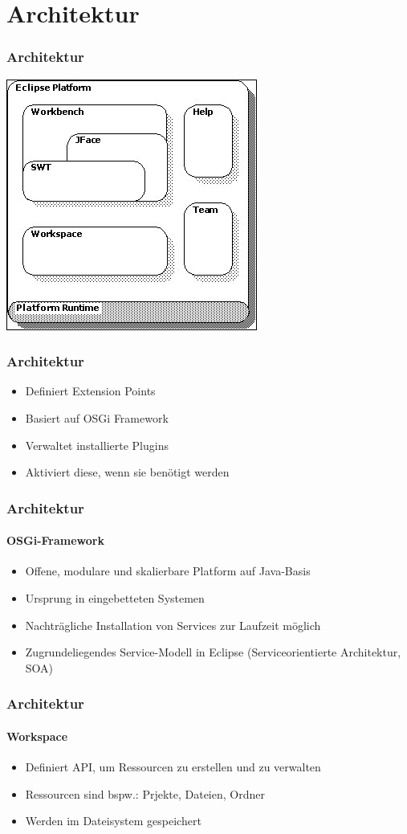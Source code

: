 {\section{Architektur}
\begin{frame}
  \frametitle{Architektur}
  \includegraphics[scale=0.8]{images/architecture.jpg}
\end{frame}

\begin{frame}
  \frametitle{Architektur}
  \begin{itemize}
    \item Definiert Extension Points
    \item Basiert auf OSGi Framework
    \item Verwaltet installierte Plugins
    \item Aktiviert diese, wenn sie benötigt werden
  \end{itemize}
\end{frame}

\begin{frame}
  \frametitle{Architektur}
  \framesubtitle{OSGi-Framework}
  \begin{itemize}
    \item Offene, modulare und skalierbare Platform auf Java-Basis
    \item Ursprung in eingebetteten Systemen
    \item Nachträgliche Installation von Services zur Laufzeit möglich
    \item Zugrundeliegendes Service-Modell in Eclipse (Serviceorientierte Architektur, SOA)
  \end{itemize}
\end{frame}

\begin{frame}
  \frametitle{Architektur}
  \framesubtitle{Workspace}
  \begin{itemize}
    \item Definiert API, um Ressourcen zu erstellen und zu verwalten
    \item Ressourcen sind bspw.: Prjekte, Dateien, Ordner
    \item Werden im Dateisystem gespeichert
  \end{itemize}
\end{frame}

}
